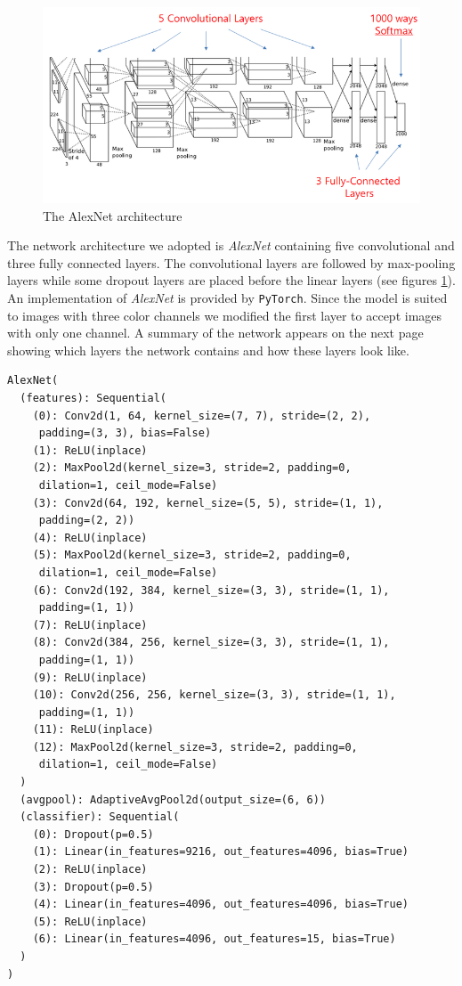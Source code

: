 \documentclass[11pt]{article}
\begin{document}
		\begin{figure}[h!]
			\includegraphics[width=\textwidth]{alexnet2.png}
			\caption{The AlexNet architecture}
			\label{fig:architecture}
		\end{figure}
		The network architecture we adopted is \textit{AlexNet}\cite{alexnet} containing five convolutional and three fully connected layers. The convolutional layers are followed by max-pooling layers while some dropout layers are placed before the linear layers (see figures \ref{fig:architecture}). An implementation of \textit{AlexNet} is provided by \texttt{PyTorch}. Since the model is suited to images with three color channels we modified the first layer to accept images with only one channel. A summary of the network appears on the next page showing which layers the network contains and how these layers look like.
		\newpage
			\begin{lstlisting}
AlexNet(
  (features): Sequential(
    (0): Conv2d(1, 64, kernel_size=(7, 7), stride=(2, 2),
     padding=(3, 3), bias=False)
    (1): ReLU(inplace)
    (2): MaxPool2d(kernel_size=3, stride=2, padding=0,
     dilation=1, ceil_mode=False)
    (3): Conv2d(64, 192, kernel_size=(5, 5), stride=(1, 1),
     padding=(2, 2))
    (4): ReLU(inplace)
    (5): MaxPool2d(kernel_size=3, stride=2, padding=0,
     dilation=1, ceil_mode=False)
    (6): Conv2d(192, 384, kernel_size=(3, 3), stride=(1, 1),
     padding=(1, 1))
    (7): ReLU(inplace)
    (8): Conv2d(384, 256, kernel_size=(3, 3), stride=(1, 1),
     padding=(1, 1))
    (9): ReLU(inplace)
    (10): Conv2d(256, 256, kernel_size=(3, 3), stride=(1, 1),
     padding=(1, 1))
    (11): ReLU(inplace)
    (12): MaxPool2d(kernel_size=3, stride=2, padding=0,
     dilation=1, ceil_mode=False)
  )
  (avgpool): AdaptiveAvgPool2d(output_size=(6, 6))
  (classifier): Sequential(
    (0): Dropout(p=0.5)
    (1): Linear(in_features=9216, out_features=4096, bias=True)
    (2): ReLU(inplace)
    (3): Dropout(p=0.5)
    (4): Linear(in_features=4096, out_features=4096, bias=True)
    (5): ReLU(inplace)
    (6): Linear(in_features=4096, out_features=15, bias=True)
  )
)
		\end{lstlisting}
		\newpage
		
\end{document}
